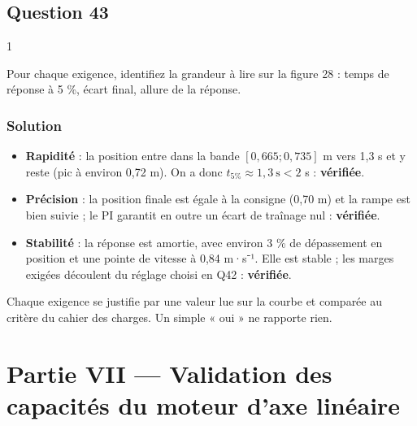 \documentclass[11pt,a4paper]{article}
\providecommand{\tightlist}{\setlength{\itemsep}{0pt}\setlength{\parskip}{0pt}}
\begin{document}
\hypertarget{question-43}{%
\subsection{Question 43}\label{question-43}}

\begin{indication}{1}

Pour chaque exigence, identifiez la grandeur à lire sur la figure 28 : temps de réponse à 5 \%, écart final, allure de la réponse.

\end{indication}

\hypertarget{solution-42}{%
\subsubsection{Solution}\label{solution-42}}

\begin{itemize}
\tightlist
\item
  \textbf{Rapidité} : la position entre dans la bande \([0{,}665;0{,}735]\) m vers 1,3 s et y reste (pic à environ 0,72 m). On a donc \(t_{5\%}\approx1{,}3\ \text{s}<2\) s : \textbf{vérifiée}.
\item
  \textbf{Précision} : la position finale est égale à la consigne (0,70 m) et la rampe est bien suivie ; le PI garantit en outre un écart de traînage nul : \textbf{vérifiée}.
\item
  \textbf{Stabilité} : la réponse est amortie, avec environ 3 \% de dépassement en position et une pointe de vitesse à 0,84 m·s⁻¹. Elle est stable ; les marges exigées découlent du réglage choisi en Q42 : \textbf{vérifiée}.
\end{itemize}

\begin{jury}

Chaque exigence se justifie par une valeur lue sur la courbe et comparée au critère du cahier des charges. Un simple « oui » ne rapporte rien.

\end{jury}

\hypertarget{partie-vii-validation-des-capacituxe9s-du-moteur-daxe-linuxe9aire}{%
\section{Partie VII --- Validation des capacités du moteur d'axe linéaire}\label{partie-vii-validation-des-capacituxe9s-du-moteur-daxe-linuxe9aire}}
\end{document}
